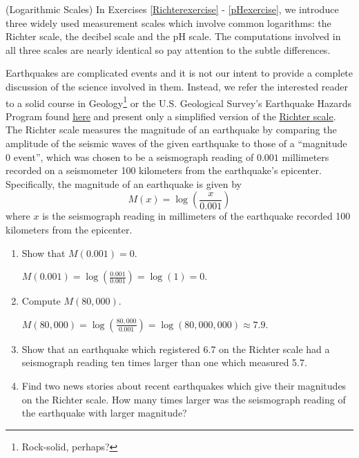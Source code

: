 \documentclass{ximera}
\begin{document}
\begin{question}\label{logarithmicscales}
(Logarithmic Scales) In Exercises \ref{Richterexercise} - \ref{pHexercise}, we introduce three widely used measurement scales which involve common logarithms: the Richter scale, the decibel scale and the pH scale.  The computations involved in all three scales are nearly identical so pay attention to the subtle differences.

\begin{problem}\label{Richterexercise} 
Earthquakes are complicated events and it is not our intent to provide a complete discussion of the science involved in them.  Instead, we refer the interested reader to a solid course in Geology\footnote{Rock-solid, perhaps?} or the U.S. Geological Survey's Earthquake Hazards Program found \href{http://earthquake.usgs.gov/}{\underline{here}} and present only a simplified version of the \href{http://en.wikipedia.org/wiki/Richter_scale}{\underline{Richter scale}}.  The Richter scale measures the magnitude of an earthquake by comparing the amplitude of the seismic waves of the given earthquake to those of a ``magnitude 0 event'', which was chosen to be a seismograph reading of $0.001$ millimeters recorded on a seismometer 100 kilometers from the earthquake's epicenter.  Specifically, the magnitude of an earthquake is given by \[M(x) = \log \left(\dfrac{x}{0.001}\right)\] where $x$ is the seismograph reading in millimeters of the earthquake recorded 100 kilometers from the epicenter.  

\begin{enumerate}

\item Show that $M(0.001) = 0$.

\begin{solution}
$M(0.001) = \log \left(\frac{0.001}{0.001} \right) = \log(1) = 0$.
\end{solution}

\item Compute $M(80,000)$.

\begin{solution}
$M(80,000) = \log \left(\frac{80,000}{0.001} \right) = \log(80,000,000) \approx 7.9$.
\end{solution}

\item Show that an earthquake which registered 6.7 on the Richter scale had a seismograph reading ten times larger than one which measured 5.7.


\item Find two news stories about recent earthquakes which give their magnitudes on the Richter scale.  How many times larger was the seismograph reading of the earthquake with larger magnitude?
\end{enumerate}


\end{problem}
\end{question}
\end{document}
